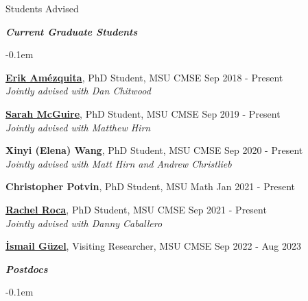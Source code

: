 \documentclass{resume} %
\begin{document}
\begin{rSection}{Students Advised}


\textbf{\textit{Current Graduate Students}}
\begin{list}{}{\leftmargin=1em}
   \itemsep -0.1em %






   \item \textbf{\href{https://www.egr.msu.edu/~amezqui3/aboutme.html}{Erik Am\'ezquita}}, PhD Student, MSU CMSE \hfill Sep 2018 - Present
\\
   \phantom{XXX} \textit{Jointly advised with Dan Chitwood}
   \item \textbf{\href{https://www.egr.msu.edu/~mcgui176/}{Sarah McGuire}}, PhD Student, MSU CMSE \hfill Sep 2019 - Present
\\
   \phantom{XXX} \textit{Jointly advised with Matthew Hirn}



   \item \textbf{Xinyi (Elena) Wang}, PhD Student, MSU CMSE \hfill Sep 2020 - Present
\\
   \phantom{XXX} \textit{Jointly advised with Matt Hirn and Andrew Christlieb}

   \item \textbf{Christopher Potvin}, PhD Student, MSU Math \hfill Jan 2021 - Present

   \item \textbf{\href{https://sites.google.com/manhattan.edu/racheleroca/home}{Rachel Roca}}, PhD Student, MSU CMSE \hfill Sep 2021 - Present
\\
   \phantom{XXX} \textit{Jointly advised with Danny Caballero}


   \item \textbf{\href{https://ismailguzel.github.io/}{\.{I}smail G\"{u}zel}}, Visiting Researcher, MSU CMSE \hfill Sep 2022 - Aug 2023


\end{list}


\textbf{\textit{Postdocs}}
\begin{list}{}{\leftmargin=1em}
   \itemsep -0.1em %



\end{list}
\end{rSection}
\end{document}
